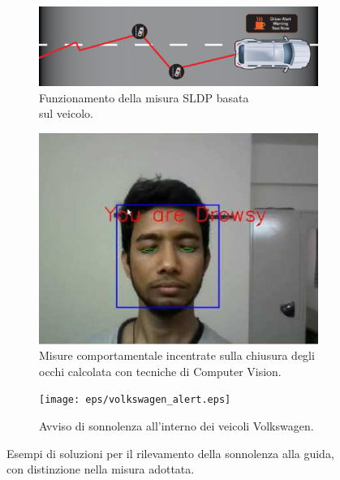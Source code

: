 \documentclass[12pt]{article}
\begin{document}
\begin{figure}
\begin{subfigure}{.55\textwidth}
		\centering
		\includegraphics[width=.8\linewidth]{eps/sdlp.eps}
		\caption{Funzionamento della misura SLDP basata\\sul veicolo.}
	\end{subfigure}
	\begin{subfigure}{.4\textwidth}
		\centering
		\includegraphics[width=.8\linewidth]{eps/ear.eps}
		\caption{Misure comportamentale incentrate sulla chiusura degli occhi calcolata con tecniche di Computer Vision.}
	\end{subfigure}
	\par\bigskip %
	\begin{subfigure}{\textwidth}
		\centering
		\texttt{[image: eps/volkswagen\_alert.eps]}
		\caption{Avviso di sonnolenza all'interno dei veicoli Volkswagen\cite{Volkswagen}.}
	\end{subfigure}
	\caption{Esempi di soluzioni per il rilevamento della sonnolenza alla guida, con distinzione nella misura adottata.}
	\label{fig:StateOfTheArt}
\end{figure}
\end{document}
